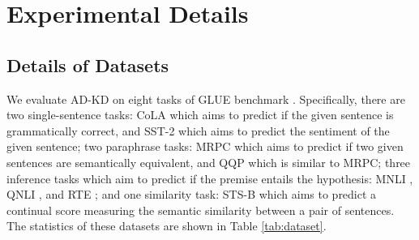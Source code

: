 \documentclass[11pt]{article}
\begin{document}
\fi




\clearpage
\appendix

\section{Experimental Details}
\subsection{Details of Datasets}\label{sec:datasets}
We evaluate AD-KD on eight tasks of GLUE benchmark \citep{wang-etal-2018-glue}. Specifically, there are two single-sentence tasks: CoLA \citep{warstadt-etal-2019-neural} which aims to predict if the given sentence is grammatically correct, and SST-2 \citep{socher-etal-2013-recursive} which aims to predict the sentiment of the given sentence; two paraphrase tasks: MRPC \citep{dolan-brockett-2005-automatically} which aims to predict if two given sentences are semantically equivalent, and QQP \citep{chen2018quora} which is similar to MRPC; three inference tasks which aim to predict if the premise entails the hypothesis: MNLI \citep{williams-etal-2018-broad}, QNLI \citep{rajpurkar-etal-2016-squad}, and RTE \citep{bentivogli2009fifth}; and one similarity task: STS-B \citep{cer-etal-2017-semeval} which aims to predict a continual score measuring the semantic similarity between a pair of sentences. The statistics of these datasets are shown in Table \ref{tab:dataset}.
\end{document}
